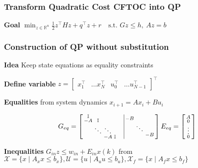 \subsubsection{Transform Quadratic Cost CFTOC into QP}

\textbf{Goal}
$\min_{z\in\mathbb{R}^n}
	\textstyle\frac{1}{2}z^\top H z + q^\top z + r
	\quad\text{s.t. }Gz\leq h,\ Az = b$


\subsubsection{Construction of QP without substitution}

\textbf{Idea} Keep state equations as equality constraints

\textbf{Define variable} $z =
	\begin{bmatrix}
		x_1^\top & \dots x_N^\top & u_0^\top & \dots u_{N-1}^\top
	\end{bmatrix}^\top$

\textbf{Equalities} from system dynamics
$x_{i+1} = Ax_i + Bu_i$

\[
	G_{eq} =
	\begin{bmatrix}
		\begin{smallmatrix}
			\mathbb{I}& & & \\
			-A & \mathbb{I} && \\
			&  \ddots & \ddots \\
			&&-A & \mathbb{I}
		\end{smallmatrix}
		 & \vline
		\begin{smallmatrix}
			-B \\
			& \ddots \\
			& &-B
		\end{smallmatrix}
	\end{bmatrix}
	E_{eq} =
	\begin{bsmallmatrix}
		A      \\
		0      \\
		\vdots \\
		0
	\end{bsmallmatrix}
\]

\textbf{Inequalities}
$G_{in}z \leq w_{in} + E_{in}x(k)$ from
$\mathcal{X}   = \{x \mid A_x x \leq b_x\},
	\mathcal{U}   = \{u \mid A_u u \leq b_u\},
	\mathcal{X}_f = \{x \mid A_f x \leq b_f\}$

